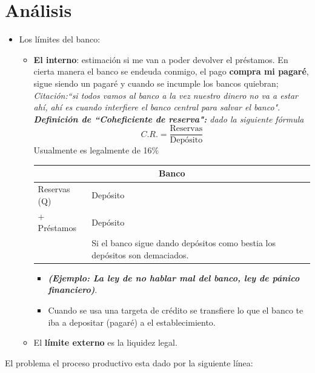 \section{Análisis }
\begin{itemize}
    \item Los límites del banco:
    \begin{itemize}
        \item \textbf{El interno}: estimación si me van a poder devolver el préstamos. En cierta manera el banco se endeuda conmigo, el pago \textbf{compra mi pagaré}, sigue siendo un pagaré y cuando se incumple los bancos quiebran; \emph{Citación:``si todos vamos al banco a la vez nuestro dinero no va a estar ahí, ahí es cuando interfiere el banco central para salvar el banco"}. \newline 
        \emph{\textbf{Definición de ``Coheficiente de reserva":} dado la siguiente fórmula }
        \[
          C.R. = \frac{\text{Reservas}}{\text{Depósito}} 
        \]
        Usualmente es legalmente de 16\%
        \begin{center}
            \begin{tabular}{ | p{5cm} | p{5cm} | }
            \hline
            \multicolumn{2}{|c|}{Banco}\\
            \hline
            Reservas (Q) &  Depósito \\ 
            + Préstamos & Depósito \\ 
            & Si el banco sigue dando depósitos como bestia los depósitos son demaciados. \\ 
            \hline
            \end{tabular}
        \end{center} 
        
        \begin{itemize}
            \item \textbf{\emph{(Ejemplo: La ley de no hablar mal del banco, ley de pánico financiero)}}.
            \item Cuando se usa una targeta de crédito se transfiere lo que el banco te iba a depositar (pagaré) a el establecimiento. 
        \end{itemize}
        
        \item El \textbf{límite externo} es la liquidez legal.
    \end{itemize}
\end{itemize}


El problema el proceso productivo esta dado por la siguiente línea:

